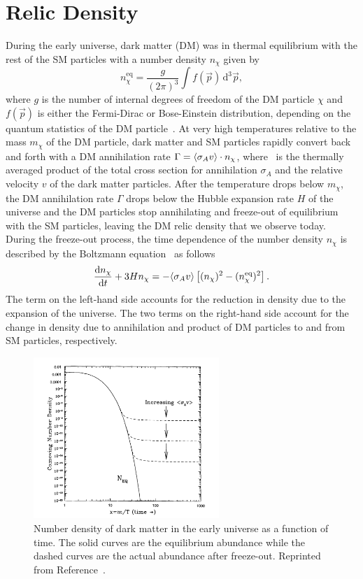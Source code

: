 \section{Relic Density}
\label{sec:dm_relic}

During the early universe, dark matter (DM) was in thermal equilibrium with the rest of the SM particles with a number density $n_\chi$ given by
\begin{equation}
  n_\chi^{\text{eq}} = \frac{g}{(2\pi)^3} \int f(\vec p) \, \text{d}^3 \vec p,
\end{equation}
where $g$ is the number of internal degrees of freedom of the DM particle $\chi$ and $f(\vec p)$ is either the Fermi-Dirac or Bose-Einstein distribution, depending on the quantum statistics of the DM particle~\cite{Jungman1996}.
At very high temperatures relative to the mass $m_\chi$ of the DM particle, dark matter and SM particles rapidly convert back and forth with a DM annihilation rate $\Gamma = \langle \sigma_A v \rangle \cdot n_\chi$, where \sigmav\ is the thermally averaged product of the total cross section for annihilation $\sigma_A$ and the relative velocity $v$ of the dark matter particles.
After the temperature drops below $m_\chi$, the DM annihilation rate $\Gamma$ drops below the Hubble expansion rate $H$ of the universe and the DM particles stop annihilating and freeze-out of equilibrium with the SM particles, leaving the DM relic density that we observe today.
During the freeze-out process, the time dependence of the number density $n_\chi$ is described by the Boltzmann equation~\cite{Jungman1996} as follows
\begin{equation}
  \frac{\text{d} n_\chi}{\text{d}t} + 3 H n_\chi = - \langle \sigma_A v \rangle \left[ (n_\chi)^2 - (n_\chi^{\text{eq}})^2\right].
\end{equation}
The term on the left-hand side accounts for the reduction in density due to the expansion of the universe.
The two terms on the right-hand side account for the change in density due to annihilation and product of DM particles to and from SM particles, respectively.

\begin{figure}[htbp]
  \centering
  \includegraphics[width=0.625\textwidth]{DarkMatter/Figures/relic_density.png}
  \caption{
    Number density of dark matter in the early universe as a function of time.
    The solid curves are the equilibrium abundance while the dashed curves are the actual abundance after freeze-out.
    Reprinted from Reference~\cite{Jungman1996}. 
  }
  \label{fig:relic_density}
\end{figure}

